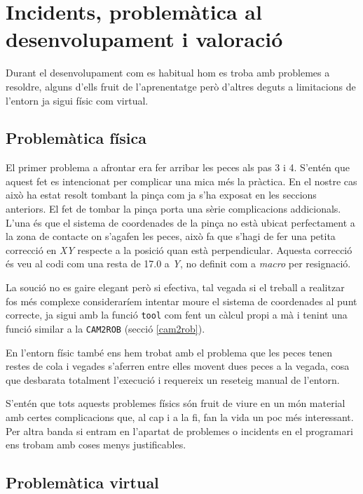 \section{Incidents, problemàtica al desenvolupament i valoració}\label{incidents}

Durant el desenvolupament com es habitual hom es troba amb problemes a resoldre,
alguns d'ells fruit de l'aprenentatge però d'altres deguts a limitacions
de l'entorn ja sigui físic com virtual.

\subsection{Problemàtica física}

El primer problema a afrontar era fer arribar les peces als pas 3 i 4. 
S'entén que aquest fet es intencionat per complicar una mica
més la pràctica. En el nostre cas això ha estat resolt tombant la pinça com ja s'ha exposat en
les seccions anteriors. El fet de tombar la pinça porta una sèrie complicacions 
addicionals. L'una és que el sistema de coordenades de la pinça no està
ubicat perfectament a la zona de contacte on s'agafen les peces, això fa que
s'hagi de fer una petita correcció en \emph{XY} respecte
a la posició quan està perpendicular. Aquesta correcció és veu al codi com una
resta de 17.0 a \emph{Y}, no definit com a \emph{macro} per resignació.

La so\lgem ució no es gaire elegant però si efectiva, tal vegada si el 
treball a realitzar fos més complexe consideraríem intentar moure el sistema
de coordenades al punt correcte, ja sigui amb la funció \texttt{tool}
com fent un càlcul propi a mà i tenint una funció similar a la \texttt{CAM2ROB}
(secció \ref{cam2rob}).

En l'entorn físic també ens hem trobat amb el problema que les peces
tenen restes de cola i vegades s'aferren entre elles movent dues peces a la
vegada, cosa que desbarata totalment l'execució i requereix un reseteig manual
de l'entorn.

S'entén que tots aquests problemes físics són fruit de viure en un món
material amb certes complicacions que, al cap i a la fi, fan la vida un poc més
interessant. Per altra banda si entram en l'apartat de problemes o incidents
en el programari ens trobam amb coses menys justificables.

\subsection{Problemàtica virtual}

